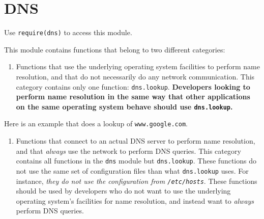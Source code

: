 \section{DNS}\label{dns}

\begin{Shaded}
\begin{Highlighting}[]
 
\end{Highlighting}
\end{Shaded}

Use \texttt{require(\textquotesingle{}dns\textquotesingle{})} to access
this module.

This module contains functions that belong to two different categories:

\begin{enumerate}
\def\labelenumi{\arabic{enumi})}
\itemsep1pt\parskip0pt
\item
  Functions that use the underlying operating system facilities to
  perform name resolution, and that do not necessarily do any network
  communication. This category contains only one function:
  \texttt{dns.lookup}. \textbf{Developers looking to perform name
  resolution in the same way that other applications on the same
  operating system behave should use \texttt{dns.lookup}.}
\end{enumerate}

Here is an example that does a lookup of \texttt{www.google.com}.

\begin{Shaded}
\begin{Highlighting}[]
 \NormalTok{(}\NormalTok{);}

\NormalTok{(}\NormalTok{, } 
  \NormalTok{(}
\NormalTok{\});}
\end{Highlighting}
\end{Shaded}

\begin{enumerate}
\def\labelenumi{\arabic{enumi})}
\setcounter{enumi}{1}
\itemsep1pt\parskip0pt
\item
  Functions that connect to an actual DNS server to perform name
  resolution, and that \emph{always} use the network to perform DNS
  queries. This category contains all functions in the \texttt{dns}
  module but \texttt{dns.lookup}. These functions do not use the same
  set of configuration files than what \texttt{dns.lookup} uses. For
  instance, \emph{they do not use the configuration from
  \texttt{/etc/hosts}}. These functions should be used by developers who
  do not want to use the underlying operating system's facilities for
  name resolution, and instead want to \emph{always} perform DNS
  queries.
\end{enumerate}

